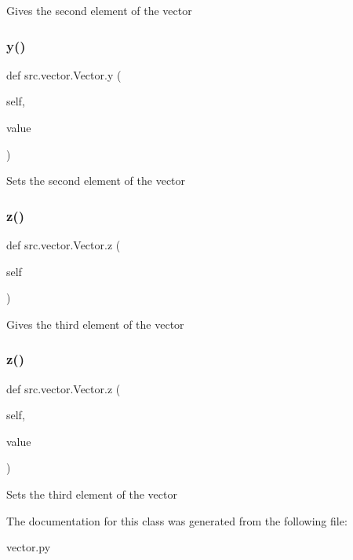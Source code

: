 \begin{DoxyVerb}Gives the second element of the vector\end{DoxyVerb}
 \mbox{\label{classsrc_1_1vector_1_1Vector_a5092574be2347f8180ad075d02bed8a4}} 
\subsubsection{\texorpdfstring{y()}{y()}\hspace{0.1cm}{\footnotesize\ttfamily [2/2]}}
{\footnotesize\ttfamily def src.\+vector.\+Vector.\+y (\begin{DoxyParamCaption}\item[{}]{self,  }\item[{}]{value }\end{DoxyParamCaption})}

\begin{DoxyVerb}Sets the second element of the vector\end{DoxyVerb}
 \mbox{\label{classsrc_1_1vector_1_1Vector_ad5748eb92e6740c1b7f59dd49427c1a4}} 
\subsubsection{\texorpdfstring{z()}{z()}\hspace{0.1cm}{\footnotesize\ttfamily [1/2]}}
{\footnotesize\ttfamily def src.\+vector.\+Vector.\+z (\begin{DoxyParamCaption}\item[{}]{self }\end{DoxyParamCaption})}

\begin{DoxyVerb}Gives the third element of the vector\end{DoxyVerb}
 \mbox{\label{classsrc_1_1vector_1_1Vector_aa2556d0f66ff3fa60b36c15fe8b41152}} 
\subsubsection{\texorpdfstring{z()}{z()}\hspace{0.1cm}{\footnotesize\ttfamily [2/2]}}
{\footnotesize\ttfamily def src.\+vector.\+Vector.\+z (\begin{DoxyParamCaption}\item[{}]{self,  }\item[{}]{value }\end{DoxyParamCaption})}

\begin{DoxyVerb}Sets the third element of the vector\end{DoxyVerb}
 

The documentation for this class was generated from the following file\+:\begin{DoxyCompactItemize}
\item 
vector.\+py\end{DoxyCompactItemize}
